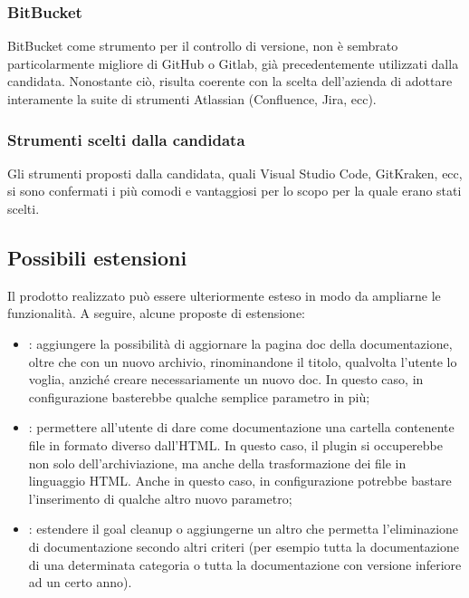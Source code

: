     \subsubsection{BitBucket}
    BitBucket come strumento per il controllo di versione, non è sembrato particolarmente migliore di GitHub o Gitlab, già precedentemente utilizzati dalla candidata.
    Nonostante ciò, risulta coerente con la scelta dell'azienda di adottare interamente la suite di strumenti Atlassian (Confluence, Jira, ecc).

    \subsubsection{Strumenti scelti dalla candidata}
    Gli strumenti proposti dalla candidata, quali Visual Studio Code, GitKraken, ecc, si sono confermati i più comodi e vantaggiosi per lo scopo per la quale erano stati scelti.




\subsection{Possibili estensioni}
Il prodotto realizzato può essere ulteriormente esteso in modo da ampliarne le funzionalità.
A seguire, alcune proposte di estensione:
\begin{itemize}
    \item {}: aggiungere la possibilità di aggiornare la pagina doc della documentazione, oltre che con un nuovo archivio, rinominandone il titolo, qualvolta l'utente lo voglia, anziché creare necessariamente un nuovo doc. In questo caso, in configurazione basterebbe qualche semplice parametro in più;
    \item {}: permettere all'utente di dare come documentazione una cartella contenente file in formato diverso dall'HTML. In questo caso, il plugin si occuperebbe non solo dell'archiviazione, ma anche della trasformazione dei file in linguaggio HTML. Anche in questo caso, in configurazione potrebbe bastare l'inserimento di qualche altro nuovo parametro;
    \item {}: estendere il goal cleanup o aggiungerne un altro che permetta l'eliminazione di documentazione secondo altri criteri (per esempio tutta la documentazione di una determinata categoria o tutta la documentazione con versione inferiore ad un certo anno).
\end{itemize} 

